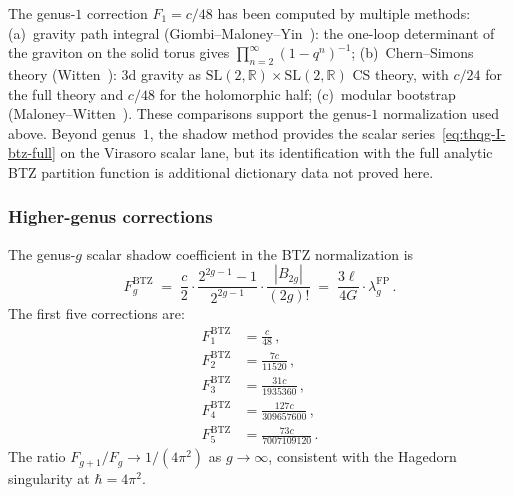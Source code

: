 \begin{remark}
\label{rem:thqg-I-comparison-btz}
The genus-$1$ correction $F_1 = c/48$ has been computed by multiple
methods: (a)~gravity path integral (Giombi--Maloney--Yin~\cite{GMY08}):
the one-loop determinant of the graviton on the solid torus gives
$\prod_{n=2}^{\infty} (1 - q^n)^{-1}$; (b)~Chern--Simons theory
(Witten~\cite{Witten88}): 3d gravity as
$\mathrm{SL}(2,\mathbb{R}) \times \mathrm{SL}(2,\mathbb{R})$ CS theory,
with $c/24$ for the full theory and $c/48$ for the holomorphic half;
(c)~modular bootstrap (Maloney--Witten~\cite{MW10}). These comparisons
support the genus-$1$ normalization used above. Beyond genus~$1$, the
shadow method provides the scalar series~\eqref{eq:thqg-I-btz-full} on
the Virasoro scalar lane, but its identification with the full analytic
BTZ partition function is additional dictionary data not proved here.
\end{remark}

\subsubsection{Higher-genus corrections}

\begin{proposition}
\label{prop:thqg-I-btz-higher-genus}
The genus-$g$ scalar shadow coefficient in the BTZ normalization is
\begin{equation}\label{eq:thqg-I-btz-Fg}
F_g^{\mathrm{BTZ}} \;=\; \frac{c}{2} \cdot \frac{2^{2g-1}-1}{2^{2g-1}} \cdot \frac{|B_{2g}|}{(2g)!} \;=\; \frac{3\ell}{4G} \cdot \lambda_g^{\mathrm{FP}}\,.
\end{equation}
The first five corrections are:
\begin{align}
F_1^{\mathrm{BTZ}} &= \frac{c}{48}\,, \label{eq:thqg-I-btz-F1-val} \\
F_2^{\mathrm{BTZ}} &= \frac{7c}{11520}\,, \label{eq:thqg-I-btz-F2-val} \\
F_3^{\mathrm{BTZ}} &= \frac{31c}{1935360}\,, \label{eq:thqg-I-btz-F3-val} \\
F_4^{\mathrm{BTZ}} &= \frac{127c}{309657600}\,, \label{eq:thqg-I-btz-F4-val} \\
F_5^{\mathrm{BTZ}} &= \frac{73c}{7007109120}\,. \label{eq:thqg-I-btz-F5-val}
\end{align}
The ratio $F_{g+1}/F_g \to 1/(4\pi^2)$ as $g \to \infty$, consistent with the Hagedorn singularity at $\hbar = 4\pi^2$.
\end{proposition}

